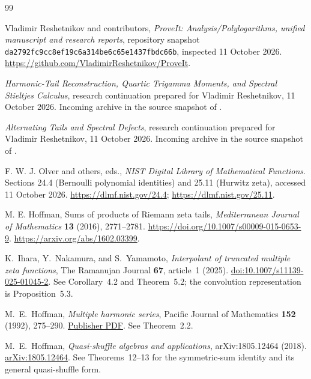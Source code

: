 \documentclass[11pt,a4paper]{article}
\numberwithin{equation}{section}
\theoremstyle{definition}
\theoremstyle{remark}
\begin{document}
\clearpage
\begin{thebibliography}{99}
\raggedright

Vladimir Reshetnikov and contributors,
\emph{ProveIt: Analysis/Polylogarithms, unified manuscript and research reports},
repository snapshot \texttt{da2792fc9cc8ef19c6a314be6c65e1437fbdc66b},
inspected 11 October 2026.
\url{https://github.com/VladimirReshetnikov/ProveIt}.

\emph{Harmonic-Tail Reconstruction, Quartic Trigamma Moments,
and Spectral Stieltjes Calculus},
research continuation prepared for Vladimir Reshetnikov, 11 October 2026.
Incoming archive 
in the source snapshot of \cite{RepoMain}.

\emph{Alternating Tails and Spectral Defects},
research continuation prepared for Vladimir Reshetnikov, 11 October 2026.
Incoming archive 
in the source snapshot of \cite{RepoMain}.

F. W. J. Olver and others, eds.,
\emph{NIST Digital Library of Mathematical Functions}.
Sections 24.4 (Bernoulli polynomial identities) and 25.11 (Hurwitz zeta),
accessed 11 October 2026.
\url{https://dlmf.nist.gov/24.4}; \url{https://dlmf.nist.gov/25.11}.

M. E. Hoffman,
Sums of products of Riemann zeta tails,
\emph{Mediterranean Journal of Mathematics} \textbf{13} (2016), 2771--2781.
\url{https://doi.org/10.1007/s00009-015-0653-9}.
\url{https://arxiv.org/abs/1602.03399}.

K.~Ihara, Y.~Nakamura, and S.~Yamamoto,
\emph{Interpolant of truncated multiple zeta functions},
The Ramanujan Journal \textbf{67}, article~1 (2025).
\href{https://doi.org/10.1007/s11139-025-01045-2}{doi:10.1007/s11139-025-01045-2}.
See Corollary~4.2 and Theorem~5.2; the convolution representation is
Proposition~5.3.


M.~E.~Hoffman, \emph{Multiple harmonic series},
Pacific Journal of Mathematics \textbf{152} (1992), 275--290.
\href{https://msp.org/pjm/1992/152-2/pjm-v152-n2-p04-s.pdf}{Publisher PDF}.
See Theorem~2.2.


M.~E.~Hoffman, \emph{Quasi-shuffle algebras and applications},
arXiv:1805.12464 (2018).
\href{https://arxiv.org/abs/1805.12464}{arXiv:1805.12464}.
See Theorems~12--13 for the symmetric-sum identity and its general
quasi-shuffle form.



\end{thebibliography}
\end{document}
